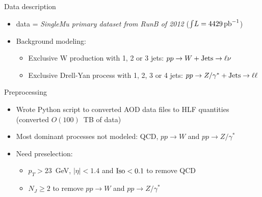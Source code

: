 \documentclass{beamer}
\begin{document}
\begin{frame}{Data description}
  \begin{itemize}
      \item<1-> data = \textit{SingleMu primary dataset from RunB of 2012} ($\int\!L = 4429\,\textup{pb}^{-1}$)
      \item<2-> Background modeling:
      \begin{itemize}
          \item<3-> Exclusive W production with 1, 2 or 3 jets: $pp \rightarrow W+\textup{Jets} \rightarrow \ell\nu$
          \item<4-> Exclusive Drell-Yan process with 1, 2, 3 or 4 jets: $pp \rightarrow Z/\gamma^* + \textup{Jets} \rightarrow \ell\ell$
      \end{itemize}
  \end{itemize}
  
\end{frame}

\begin{frame}{Preprocessing}
  \begin{itemize}
      \item<1-> Wrote Python script to converted AOD data files to HLF quantities (converted $O(100)$~TB of data)
      \item<2-> Most dominant processes not modeled: QCD, $pp \rightarrow W$ and $pp \rightarrow Z/\gamma^*$
      \item<3-> Need preselection: 
      \begin{itemize}
          \item<4-> $p_T>23$~GeV, $\left | \eta \right | < 1.4$ and $\text{Iso}<\textup{0.1}$ to remove QCD
          \item<5-> $N_J\geq 2$ to remove $pp \rightarrow W$ and $pp \rightarrow Z/\gamma^*$
      \end{itemize}
  \end{itemize}
\end{frame}
\end{document}
